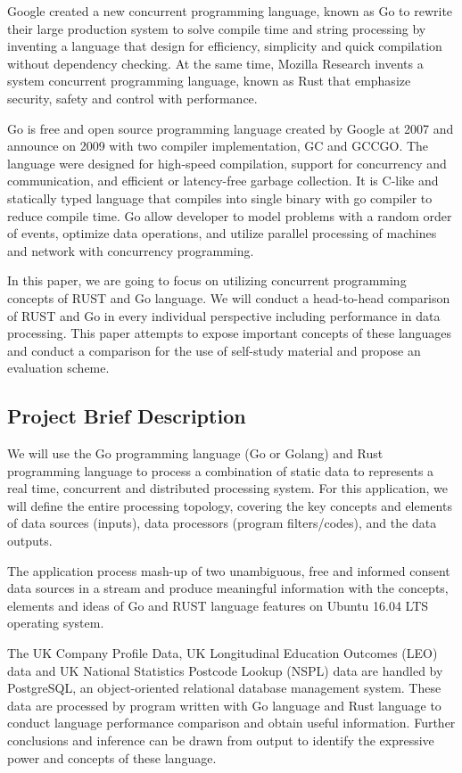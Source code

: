 Google created a new concurrent programming language, known as Go to rewrite their large production system to solve compile time and string processing by inventing a language that design for efficiency, simplicity and quick compilation without dependency checking. \cite{why-go} At the same time, Mozilla Research invents a system concurrent programming language, known as Rust that emphasize security, safety and control with performance. 

Go is free and open source programming language created by Google at 2007 and announce on 2009 \cite{golang-org} with two compiler implementation, GC and GCCGO. \cite{gcc-source} The language were designed for high-speed compilation, support for concurrency and communication, and efficient or latency-free garbage collection. It is C-like and statically typed language that compiles into single binary with go compiler to reduce compile time. Go allow developer to model problems with a random order of events, optimize data operations, and utilize parallel processing of machines and network with concurrency programming. \cite{pure-con-programming}

In this paper, we are going to focus on utilizing concurrent programming concepts of RUST and Go language. We will conduct a head-to-head comparison of RUST and Go in every individual perspective including performance in data processing. This paper attempts to expose important concepts of these languages and conduct a comparison for the use of self-study material and propose an evaluation scheme.
\pagebreak

\subsection{Project Brief Description}
We will use the Go programming language (Go or Golang) and Rust programming language to process a combination of static data to represents a real time, concurrent and distributed processing system. For this application, we will define the entire processing topology, covering the key concepts and elements of data sources (inputs), data processors (program filters/codes), and the data outputs. 

The application process mash-up of two unambiguous, free and informed consent data sources in a stream and produce meaningful information with the concepts, elements and ideas of Go and RUST language features on Ubuntu 16.04 LTS operating system.

The UK Company Profile Data, UK Longitudinal Education Outcomes (LEO) data and UK National Statistics Postcode Lookup (NSPL) data are handled by PostgreSQL, an object-oriented relational database management system. These data are processed by program written with Go language and Rust language to conduct language performance comparison and obtain useful information. Further conclusions and inference can be drawn from output to identify the expressive power and concepts of these language.

